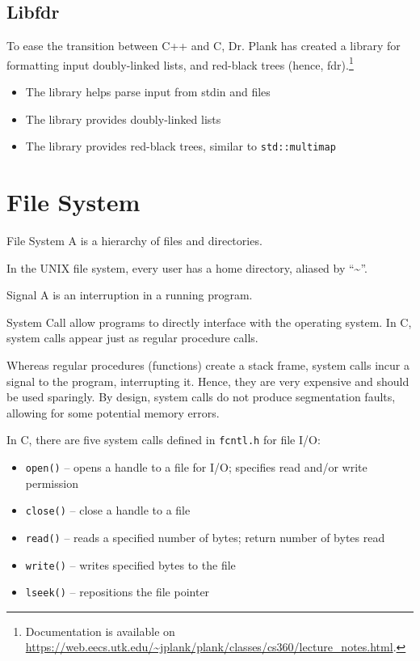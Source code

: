 \documentclass[code]{amznotes}
\begin{document}
\section{Libfdr}
To ease the transition between C++ and C, Dr. Plank has created a library for formatting input doubly-linked lists, and red-black trees (hence, fdr).\footnote{Documentation is available on \url{https://web.eecs.utk.edu/\~jplank/plank/classes/cs360/lecture_notes.html}.}
\begin{itemize}
    \item The  library helps parse input from stdin and files
    \item The  library provides doubly-linked lists
    \item The  library provides red-black trees, similar to \texttt{std::multimap}
\end{itemize}

\chapter{File System}

\begin{dfnbox}{File System}{}
    A  is a hierarchy of files and directories.
\end{dfnbox}

In the UNIX file system, every user has a home directory, aliased by ``\textasciitilde''.

\begin{dfnbox}{Signal}{}
    A  is an interruption in a running program.
\end{dfnbox}

\begin{dfnbox}{System Call}{}
     allow programs to directly interface with the operating system. In C, system calls appear just as regular procedure calls.
\end{dfnbox}

Whereas regular procedures (functions) create a stack frame, system calls incur a signal to the program, interrupting it. Hence, they are very expensive and should be used sparingly. By design, system calls do not produce segmentation faults, allowing for some potential memory errors.

In C, there are five system calls defined in \texttt{fcntl.h} for file I/O:
\begin{itemize}[noitemsep]
    \item \texttt{open()} -- opens a handle to a file for I/O; specifies read and/or write permission
    \item \texttt{close()} -- close a handle to a file
    \item \texttt{read()} -- reads a specified number of bytes; return number of bytes read
    \item \texttt{write()} -- writes specified bytes to the file
    \item \texttt{lseek()} -- repositions the file pointer
\end{itemize}
\end{document}

